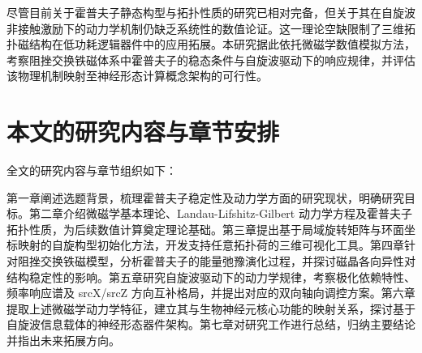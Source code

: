 尽管目前关于霍普夫子静态构型与拓扑性质的研究已相对完备，但关于其在自旋波非接触激励下的动力学机制仍缺乏系统性的数值论证。这一理论空缺限制了三维拓扑磁结构在低功耗逻辑器件中的应用拓展。本研究据此依托微磁学数值模拟方法，考察阻挫交换铁磁体系中霍普夫子的稳态条件与自旋波驱动下的响应规律，并评估该物理机制映射至神经形态计算概念架构的可行性。


\section{本文的研究内容与章节安排}

全文的研究内容与章节组织如下：

第一章阐述选题背景，梳理霍普夫子稳定性及动力学方面的研究现状，明确研究目标。第二章介绍微磁学基本理论、Landau-Lifshitz-Gilbert 动力学方程及霍普夫子拓扑性质，为后续数值计算奠定理论基础。第三章提出基于局域旋转矩阵与环面坐标映射的自旋构型初始化方法，开发支持任意拓扑荷的三维可视化工具。第四章针对阻挫交换铁磁模型，分析霍普夫子的能量弛豫演化过程，并探讨磁晶各向异性对结构稳定性的影响。第五章研究自旋波驱动下的动力学规律，考察极化依赖特性、频率响应谱及 srcX/srcZ 方向互补格局，并提出对应的双向轴向调控方案。第六章提取上述微磁学动力学特征，建立其与生物神经元核心功能的映射关系，探讨基于自旋波信息载体的神经形态器件架构。第七章对研究工作进行总结，归纳主要结论并指出未来拓展方向。
